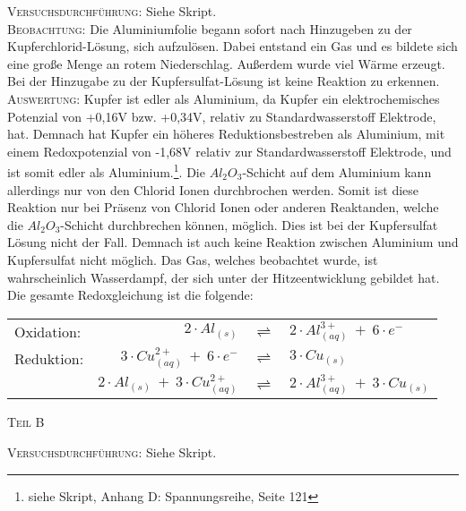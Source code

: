\documentclass[A4paper, 11p]{article}
\begin{document}
\textsc{Versuchsdurchführung:} Siehe Skript.\\

\textsc{Beobachtung:}\hspace{5mm} Die Aluminiumfolie begann sofort nach Hinzugeben zu der Kupferchlorid-Lösung, sich aufzulösen. Dabei entstand ein Gas und es bildete sich eine große Menge an rotem Niederschlag. Außerdem wurde viel Wärme erzeugt. Bei der Hinzugabe zu der Kupfersulfat-Lösung ist keine Reaktion zu erkennen.\\

\textsc{Auswertung:}\hspace{8mm} Kupfer ist edler als Aluminium, da Kupfer ein elektrochemisches Potenzial von +0,16V bzw. +0,34V, relativ zu Standardwasserstoff Elektrode, hat. Demnach hat Kupfer ein höheres Reduktionsbestreben als Aluminium, mit einem Redoxpotenzial von -1,68V relativ zur Standardwasserstoff Elektrode, und ist somit edler als Aluminium.\footnote{siehe Skript, Anhang D: Spannungsreihe, Seite 121}. Die $Al_2O_3$-Schicht auf dem Aluminium kann allerdings nur von den Chlorid Ionen durchbrochen werden. Somit ist diese Reaktion nur bei Präsenz von Chlorid Ionen oder anderen Reaktanden, welche die $Al_2O_3$-Schicht durchbrechen können, möglich. Dies ist bei der Kupfersulfat Lösung nicht der Fall. Demnach ist auch keine Reaktion zwischen Aluminium und Kupfersulfat nicht möglich. Das Gas, welches beobachtet wurde, ist wahrscheinlich Wasserdampf, der sich unter der Hitzeentwicklung gebildet hat. Die gesamte Redoxgleichung ist die folgende:\\

\begin{center}
\begin{tabular}{lrcl}
Oxidation:&$2\cdot Al_{(s)}$&$\rightleftharpoons$&$2\cdot Al^{3+}_{(aq)}\ +\ 6\cdot e^-$\\
Reduktion:&$3\cdot Cu^{2+}_{(aq)}\ +\ 6\cdot e^-$&$\rightleftharpoons$&$3\cdot Cu_{(s)}$\\
\hline
 &$2\cdot Al_{(s)}\ +\ 3\cdot Cu^{2+}_{(aq)}$&$\rightleftharpoons$&$2\cdot Al^{3+}_{(aq)}\ +\ 3\cdot Cu_{(s)}$\\
\end{tabular}
\end{center}

\begin{center}
\textsc{Teil B}
\end{center}

\textsc{Versuchsdurchführung:} Siehe Skript.\\
\end{document}
